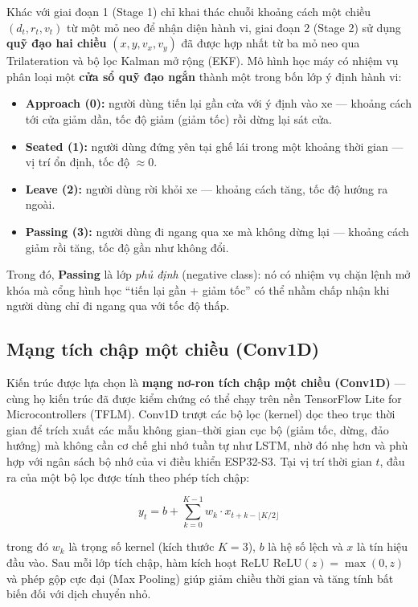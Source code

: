 Khác với giai đoạn 1 (Stage 1) chỉ khai thác chuỗi khoảng cách một chiều $(d_t, r_t, v_t)$ từ một mỏ neo để nhận diện hành vi, giai đoạn 2 (Stage 2) sử dụng \textbf{quỹ đạo hai chiều} $(x, y, v_x, v_y)$ đã được hợp nhất từ ba mỏ neo qua Trilateration và bộ lọc Kalman mở rộng (EKF). Mô hình học máy có nhiệm vụ phân loại một \textbf{cửa sổ quỹ đạo ngắn} thành một trong bốn lớp ý định hành vi:

\begin{itemize}
    \item \textbf{Approach (0):} người dùng tiến lại gần cửa với ý định vào xe --- khoảng cách tới cửa giảm dần, tốc độ giảm (giảm tốc) rồi dừng lại sát cửa.
    \item \textbf{Seated (1):} người dùng đứng yên tại ghế lái trong một khoảng thời gian --- vị trí ổn định, tốc độ $\approx 0$.
    \item \textbf{Leave (2):} người dùng rời khỏi xe --- khoảng cách tăng, tốc độ hướng ra ngoài.
    \item \textbf{Passing (3):} người dùng đi ngang qua xe mà không dừng lại --- khoảng cách giảm rồi tăng, tốc độ gần như không đổi.
\end{itemize}

Trong đó, \textbf{Passing} là lớp \textit{phủ định} (negative class): nó có nhiệm vụ chặn lệnh mở khóa mà cổng hình học ``tiến lại gần + giảm tốc'' có thể nhầm chấp nhận khi người dùng chỉ đi ngang qua với tốc độ thấp.

\subsection{Mạng tích chập một chiều (Conv1D)}

Kiến trúc được lựa chọn là \textbf{mạng nơ-ron tích chập một chiều (Conv1D)} --- cùng họ kiến trúc đã được kiểm chứng có thể chạy trên nền TensorFlow Lite for Microcontrollers (TFLM). Conv1D trượt các bộ lọc (kernel) dọc theo trục thời gian để trích xuất các mẫu không gian--thời gian cục bộ (giảm tốc, dừng, đảo hướng) mà không cần cơ chế ghi nhớ tuần tự như LSTM, nhờ đó nhẹ hơn và phù hợp với ngân sách bộ nhớ của vi điều khiển ESP32-S3. Tại vị trí thời gian $t$, đầu ra của một bộ lọc được tính theo phép tích chập:

\begin{equation}
    y_t = b + \sum_{k=0}^{K-1} w_k \cdot x_{t+k-\lfloor K/2\rfloor}
\end{equation}

trong đó $w_k$ là trọng số kernel (kích thước $K=3$), $b$ là hệ số lệch và $x$ là tín hiệu đầu vào. Sau mỗi lớp tích chập, hàm kích hoạt ReLU $\mathrm{ReLU}(z)=\max(0,z)$ và phép gộp cực đại (Max Pooling) giúp giảm chiều thời gian và tăng tính bất biến đối với dịch chuyển nhỏ.

